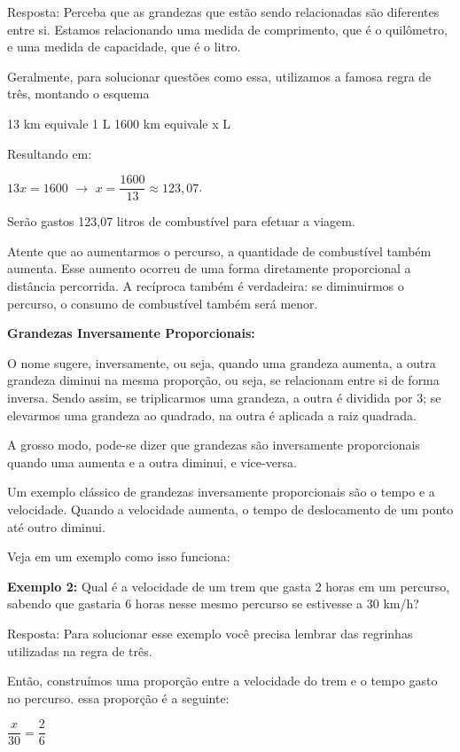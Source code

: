 \begin{multicols*}{2}
    Resposta: Perceba que as grandezas que estão sendo relacionadas são diferentes entre si. Estamos relacionando uma medida de comprimento, que é o quilômetro, e uma medida de capacidade, que é o litro.

    Geralmente, para solucionar questões como essa, utilizamos a famosa regra de três, montando o esquema

    13 km   equivale 1 L
    1600 km equivale x L

    Resultando em:

    $ 13x = 1600 \, \, \to \, \, x = \dfrac{1600}{13} \approx 123,07 $.

    Serão gastos 123,07 litros de combustível para efetuar a viagem.

    Atente que ao aumentarmos o percurso, a quantidade de combustível também aumenta. Esse aumento ocorreu de uma forma diretamente proporcional a distância percorrida. A recíproca também é verdadeira: se diminuirmos o percurso, o consumo de combustível também será menor.

    \textbf{Grandezas Inversamente Proporcionais:}

    O nome sugere, inversamente, ou seja, quando uma grandeza aumenta, a outra grandeza diminui na mesma proporção, ou seja, se relacionam entre si de forma inversa. Sendo assim, se triplicarmos uma grandeza, a outra é dividida por 3; se elevarmos uma grandeza ao quadrado, na outra é aplicada a raiz quadrada.

    A grosso modo, pode-se dizer que grandezas são inversamente proporcionais quando uma aumenta e a outra diminui, e vice-versa.

    Um exemplo clássico de grandezas inversamente proporcionais são o tempo e a velocidade. Quando a velocidade aumenta, o tempo de deslocamento de um ponto até outro diminui.

    Veja em um exemplo como isso funciona:

    \textbf{Exemplo 2:} Qual é a velocidade de um trem que gasta 2 horas em um percurso, sabendo que gastaria 6 horas nesse mesmo percurso se estivesse a 30 km/h?

    Resposta: Para solucionar esse exemplo você precisa lembrar das regrinhas utilizadas na regra de três.

    Então, construímos uma proporção entre a velocidade do trem e o tempo gasto no percurso. essa proporção é a seguinte:

    $ \dfrac{x}{30} = \dfrac{2}{6} $\\


\end{multicols*}
